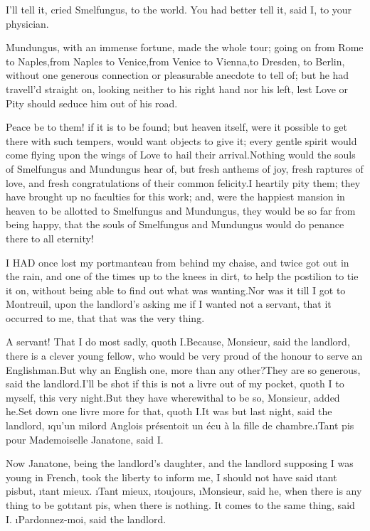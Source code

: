 \documentclass[twoside]{article}
\begin{document}
\tsk I’ll tell it, cried Smelfungus, to the world.  You had better tell it,
said I, to your physician.

Mundungus, with an immense fortune, made the whole tour; going on from
Rome to Naples,\tsk from Naples to Venice,\tsk from Venice to Vienna,\tsk to Dresden,
to Berlin, without one generous connection or pleasurable anecdote to
tell of; but he had travell’d straight on, looking neither to his right
hand nor his left, lest Love or Pity should seduce him out of his road.

Peace be to them! if it is to be found; but heaven itself, were it
possible to get there with such tempers, would want objects to give it;
every gentle spirit would come flying upon the wings of Love to hail
their arrival.\tsk Nothing would the souls of Smelfungus and Mundungus hear
of, but fresh anthems of joy, fresh raptures of love, and fresh
congratulations of their common felicity.\tsk I heartily pity them; they have
brought up no faculties for this work; and, were the happiest mansion in
heaven to be allotted to Smelfungus and Mundungus, they would be so far
from being happy, that the souls of Smelfungus and Mundungus would do
penance there to all eternity!






I HAD once lost my portmanteau from behind my chaise, and twice got out
in the rain, and one of the times up to the knees in dirt, to help the
postilion to tie it on, without being able to find out what was
wanting.\tsk Nor was it till I got to Montreuil, upon the landlord’s asking
me if I wanted not a servant, that it occurred to me, that that was the
very thing.

A servant!  That I do most sadly, quoth I.\tsk Because, Monsieur, said the
landlord, there is a clever young fellow, who would be very proud of the
honour to serve an Englishman.\tsk But why an English one, more than any
other?\tsk They are so generous, said the landlord.\tsk I’ll be shot if this is
not a livre out of my pocket, quoth I to myself, this very night.\tsk But
they have wherewithal to be so, Monsieur, added he.\tsk Set down one livre
more for that, quoth I.\tsk It was but last night, said the landlord, \i{qu’un
milord Anglois présentoit un écu à la fille de chambre}.\tsk \i{Tant pis pour
Mademoiselle Janatone}, said I.

Now Janatone, being the landlord’s daughter, and the landlord supposing I
was young in French, took the liberty to inform me, I should not have
said \i{tant pis}\tsk but, \i{tant mieux}.  \i{Tant mieux}, \i{toujours}, \i{Monsieur},
said he, when there is any thing to be got\tsk \i{tant pis}, when there is
nothing.  It comes to the same thing, said I.  \i{Pardonnez-moi}, said the
landlord.
\end{document}
